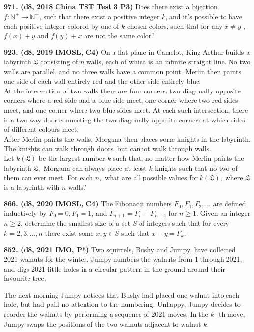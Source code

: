 \documentclass{article}
\begin{document}
\textbf{971. (\color{red}d8\color{black}, 2018 China TST Test 3 P3)} Does there exist a bijection $f:\mathbb{N}^{+} \rightarrow \mathbb{N}^{+}$, such that there exist a positive integer $k$, and it's possible to have each positive integer colored by one of $k$ chosen colors, such that for any $x \neq y$ , $f(x)+y$ and $f(y)+x$ are not the same color?

\textbf{923. (\color{red}d8\color{black}, 2019 IMOSL, C4)} \setlength\parindent{1.5em}
On a flat plane in Camelot, King Arthur builds a labyrinth $\mathfrak{L}$ consisting of $n$ walls, each of which is an infinite straight line. No two walls are parallel, and no three walls have a common point. Merlin then paints one side of each wall entirely red and the other side entirely blue.\\
\indent At the intersection of two walls there are four corners: two diagonally opposite corners where a red side and a blue side meet, one corner where two red sides meet, and one corner where two blue sides meet. At each such intersection, there is a two-way door connecting the two diagonally opposite corners at which sides of different colours meet.\\
\indent After Merlin paints the walls, Morgana then places some knights in the labyrinth. The knights can walk through doors, but cannot walk through walls.\\
\indent Let $k(\mathfrak{L})$ be the largest number $k$ such that, no matter how Merlin paints the labyrinth $\mathfrak{L},$ Morgana can always place at least $k$ knights such that no two of them can ever meet. For each $n,$ what are all possible values for $k(\mathfrak{L}),$ where $\mathfrak{L}$ is a labyrinth with $n$ walls?

\textbf{866. (\color{red}d8\color{black}, 2020 IMOSL, C4)} The Fibonacci numbers $F_0, F_1, F_2, . . .$ are defined inductively by $F_0=0, F_1=1$, and $F_{n+1}=F_n+F_{n-1}$ for $n \ge 1$. Given an integer $n \ge 2$, determine the smallest size of a set $S$ of integers such that for every $k=2, 3, . . . , n$ there exist some $x, y \in S$ such that $x-y=F_k$.

\textbf{852. (\color{red}d8\color{black}, 2021 IMO, P5)} Two squirrels, Bushy and Jumpy, have collected 2021 walnuts for the winter. Jumpy numbers the walnuts from 1 through 2021, and digs 2021 little holes in a circular pattern in the ground around their favourite tree.

The next morning Jumpy notices that Bushy had placed one walnut into each hole, but had paid no attention to the numbering. Unhappy, Jumpy decides to reorder the walnuts by performing a sequence of 2021 moves. In the $k$ -th move, Jumpy swaps the positions of the two walnuts adjacent to walnut $k$.\\
\end{document}
